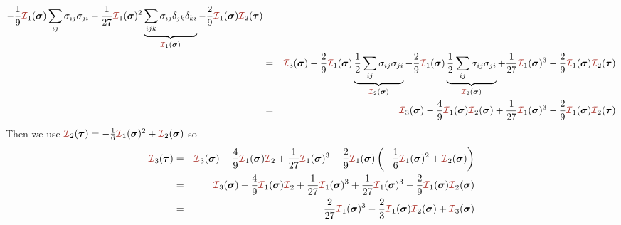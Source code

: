 \begin{eqnarray}
-\frac19 {\III}_1(\bm\sigma)  \sum_{ij} \sigma_{ij}\sigma_{ji} 
+\frac{1}{27} {\III}_1(\bm\sigma) ^2
\underbrace{\sum_{ijk}  \sigma_{ij}   \delta_{jk} \delta_{ki} }_{{\III}_1(\bm\sigma) }
-\frac29  {\III}_1(\bm\sigma)      {\III}_2(\bm\tau)
\nn\\
&=& 
{\III}_3(\bm\sigma)
-\frac29 {\III}_1(\bm\sigma)  \underbrace{\frac12 \sum_{ij} \sigma_{ij}\sigma_{ji} }_{{\III}_2(\bm\sigma)}
-\frac29 {\III}_1(\bm\sigma)  \underbrace{\frac12 \sum_{ij} \sigma_{ij}\sigma_{ji} }_{{\III}_2(\bm\sigma)}
+\frac{1}{27} {\III}_1(\bm\sigma)^3
-\frac29  {\III}_1(\bm\sigma)   {\III}_2(\bm\tau) 
\nn\\
&=& 
{\III}_3(\bm\sigma)
-\frac49 {\III}_1(\bm\sigma)  {\III}_2(\bm\sigma) 
+\frac{1}{27} {\III}_1(\bm\sigma) ^3
-\frac29  {\III}_1(\bm\sigma)     {\III}_2(\bm\tau) \nn
\end{eqnarray}
Then we use ${\III}_2(\bm\tau) = -\frac16 {\III}_1(\bm\sigma)^2 + {\III}_2(\bm\sigma)$ so 
\begin{eqnarray}
{\III}_3(\bm\tau) 
&=& 
{\III}_3(\bm\sigma)  -\frac49 {\III}_1(\bm\sigma)  {\III}_2   
+\frac{1}{27} {\III}_1(\bm\sigma) ^3   -\frac29  {\III}_1(\bm\sigma)   
\left(-\frac16 {\III}_1(\bm\sigma) ^2 + {\III}_2(\bm\sigma)   \right) \nn\\
&=& 
{\III}_3(\bm\sigma)  -\frac49 {\III}_1(\bm\sigma) {\III}_2   +\frac{1}{27} {\III}_1(\bm\sigma)^3   
+\frac{1}{27}  {\III}_1(\bm\sigma) ^3  -\frac29  {\III}_1(\bm\sigma) {\III}_2(\bm\sigma) \nn\\
&=& \frac{2}{27} {\III}_1(\bm\sigma)^3 
-\frac23 {\III}_1(\bm\sigma){\III}_2(\bm\sigma) + {\III}_3(\bm \sigma) \nn
\end{eqnarray}







\newpage

